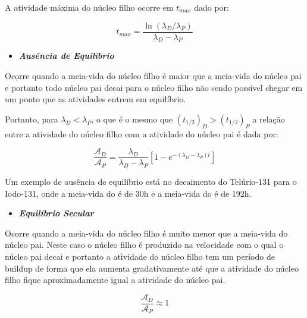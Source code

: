 \documentclass[11pt,a4paper]{article}
\newcounter{exemplo}
\begin{document}
    \noindent A atividade máxima do núcleo filho ocorre em $t_{max}$ dado por:

                \begin{equation}
                    t_{max} = \frac{\ln (\lambda_D / \lambda_P)}{\lambda_D - \lambda_P}
                \end{equation}

                \begin{itemize}
                    \item \textbf{\textit{\textcolor{CarnationPink}{Ausência de Equilíbrio}}}
                \end{itemize}

    Ocorre quando a meia-vida do núcleo filho é maior que a meia-vida do núcleo pai e portanto todo núcleo pai decai para o núcleo filho não sendo possível chegar em um ponto que as atividades entrem em equilíbrio.

    Portanto, para $\lambda_D < \lambda_P$, o que é o mesmo que  $(t_{1/2})_D > (t_{1/2})_P $ a relação entre a atividade do núcleo filho com a atividade do núcleo pai é dada por:

                        \begin{equation}
                            \frac{\mathcal{A}_D}{\mathcal{A}_P} = 
                            \frac{\lambda_D}{\lambda_D - \lambda_P} \left[1 - e^{-(\lambda_D - \lambda_P)t}\right]
                        \end{equation}
                
    Um exemplo de ausência de equilíbrio está no decaimento do Telúrio-131 para o Iodo-131, onde a meia-vida do  é de 30h e a meia-vida do  é de 192h.

                \begin{itemize}
                    \item \textbf{\textit{\textcolor{CarnationPink}{Equilíbrio Secular}}}
                \end{itemize}
        
    Ocorre quando a meia-vida do núcleo filho é muito menor que a meia-vida do núcleo pai. Neste caso o núcleo filho é produzido na velocidade com o qual o núcleo pai decai e portanto a atividade do núcleo filho tem um período de buildup de forma que ela aumenta gradativamente até que a atividade do núcleo filho fique aproximadamente igual a atividade do núcleo pai. 

                    \begin{equation}
                        \frac{\mathcal{A}_D}{\mathcal{A}_P} \approx 1
                    \end{equation}
\end{document}
